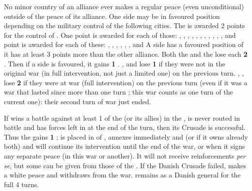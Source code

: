 \begin{digressions}

  \phpaix
  \aparag No minor country of an alliance ever makes a regular peace (even
  unconditional) outside of the peace of its alliance.
  \aparag One side may be in favoured position depending on the military
  control of the following cities.
  \bparag The \alliance is awarded 2 points for the control of \villeVienne.
  \bparag One point is awarded for each of those: \villeSpeyer, \villePrague,
  \villeMunich, \villeFreiburg, \villeStrasbourg, \villeHannover, \villeKleve,
  \villeCassel, \villeMagdeburg, \villeBerlin, \villeDresden, \villeFrankfurt
  and \villeBrunswick
  \bparag \textonehalf point is awarded for each of these: \villeKoln,
  \villeStuttgart, \villeUlm, \villeMainz, \villeTrier, \villeHamburg,
  \villeMunster and \villeErfurt
  \bparag A side has a favoured position of it has at least 3 points more than
  the other alliance.
  \aparag Both the \alliance and the \ligue lose each {\bf 2} \STAB.
  \aparag Then if a side is favoured, it gains {\bf 1} \STAB.
  \aparag \SPA, \HOL and \AUS lose {\bf 1} \STAB if they were not in the
  original war (in full intervention, not just a limited one) on the previous
  turn.
  \aparag \SPA, \HOL, \AUS lose {\bf 2} \STAB if they were at war (full
  intervention) on the previous turn (even if it was a war that lasted since
  more than one turn ; this war counts as one turn of the current one): their
  second turn of war just ended.
\end{digressions}
\bparag If \DANdan wins a battle against at least 1 \ARMY\faceplus of the
\ligue (or its allies) in the \HRE, is never routed in battle and has forces
left in \HRE at the end of the turn, then its Crusade is successful.
\bparag Thus the \alliance gains {\bf 1} \STAB ; \DANmin is placed in \EG of
\ENG, annexes immediately \provinceLubeck and \provinceHolstein (or
\provinceMecklenburg if it owns already both) and will continue its
intervention until the end of the war, or when it signs any separate peace (in
this war or another). It will not receive reinforcements \emph{per se}, but
some can be given from those of the \alliance.
\bparag If the Danish Crusade failed, \DANmin makes a white peace and
withdraws from the war.  remains as a Danish general for
the full 4 turns.

